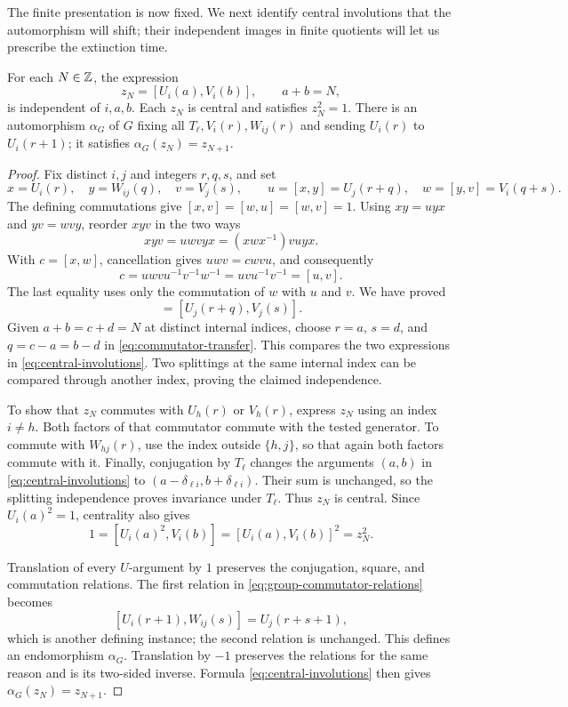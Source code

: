 The finite presentation is now fixed. We next identify central
involutions that the automorphism will shift; their independent images
in finite quotients will let us prescribe the extinction time.

\begin{lemma}
\label{lem:central-shift}
For each $N\in\mathbb Z$, the expression
\begin{equation}
  z_N=[U_i(a),V_i(b)],\qquad a+b=N,
  \label{eq:central-involutions}
\end{equation}
is independent of $i,a,b$.  Each $z_N$ is central and satisfies
$z_N^2=1$.  There is an automorphism $\alpha_G$ of $G$ fixing all
$T_\ell,V_i(r),W_{ij}(r)$ and sending $U_i(r)$ to $U_i(r+1)$;
it satisfies $\alpha_G(z_N)=z_{N+1}$.
\end{lemma}

\begin{proof}
Fix distinct $i,j$ and integers $r,q,s$, and set
\[
 x=U_i(r),\quad y=W_{ij}(q),\quad v=V_j(s),\qquad
 u=[x,y]=U_j(r+q),\quad w=[y,v]=V_i(q+s).
\]
The defining commutations give $[x,v]=[w,u]=[w,v]=1$.
Using $xy=uyx$ and $yv=wvy$, reorder $xyv$ in the two ways
\[
  xyv=uwvyx=(xwx^{-1})vuyx.
\]
With $c=[x,w]$, cancellation gives $uwv=cwvu$, and consequently
\[
  c=uwvu^{-1}v^{-1}w^{-1}=uvu^{-1}v^{-1}=[u,v].
\]
The last equality uses only the commutation of $w$ with $u$ and $v$.
We have proved
\begin{equation}
 [U_i(r),V_i(q+s)]=[U_j(r+q),V_j(s)].
 \label{eq:commutator-transfer}
\end{equation}
Given $a+b=c+d=N$ at distinct internal indices, choose
$r=a$, $s=d$, and $q=c-a=b-d$ in
\eqref{eq:commutator-transfer}.  This compares the two expressions
in \eqref{eq:central-involutions}.  Two splittings at the same
internal index can be compared through another index, proving
the claimed independence.

To show that $z_N$ commutes with $U_h(r)$ or $V_h(r)$, express
$z_N$ using an index $i\neq h$.  Both factors of that commutator
commute with the tested generator.  To commute with $W_{hj}(r)$,
use the index outside $\{h,j\}$, so that again both factors commute
with it.  Finally, conjugation by $T_\ell$ changes the arguments
$(a,b)$ in \eqref{eq:central-involutions} to
$(a-\delta_{\ell i},b+\delta_{\ell i})$.  Their sum is unchanged,
so the splitting independence proves invariance under $T_\ell$.
Thus $z_N$ is central.  Since $U_i(a)^2=1$, centrality also gives
\[
  1=[U_i(a)^2,V_i(b)]=[U_i(a),V_i(b)]^2=z_N^2.
\]

Translation of every $U$-argument by $1$ preserves the conjugation,
square, and commutation relations.  The first relation in
\eqref{eq:group-commutator-relations} becomes
\[
  [U_i(r+1),W_{ij}(s)]=U_j(r+s+1),
\]
which is another defining instance; the second relation is unchanged.
This defines an endomorphism $\alpha_G$.  Translation by $-1$
preserves the relations for the same reason and is its two-sided
inverse.  Formula \eqref{eq:central-involutions} then gives
$\alpha_G(z_N)=z_{N+1}$.
\end{proof}

